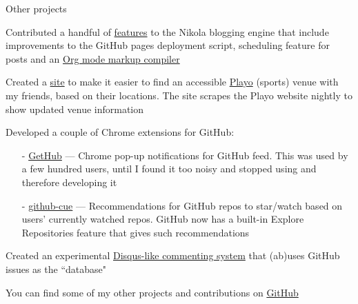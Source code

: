\begin{cventries}
{\begin{cvitems}
        \end{cvitems}
      }
  \cventry
      {Other projects}
      {}
      {} %
      {} %
      {
        \begin{cvitems} %
        \item {Contributed a handful of \href{https://github.com/getnikola/nikola/commits?author=punchagan}{features} to the Nikola blogging engine that include improvements to the GitHub pages deployment script, scheduling feature for posts and an \href{https://github.com/getnikola/plugins/tree/master/v8/orgmode}{Org mode markup compiler}}
        \item {Created a \href{https://punchagan.github.io/playo-find-venue/}{site} to make it easier to find an accessible \href{https://playo.co/}{Playo} (sports) venue with my friends, based on their locations. The site scrapes the Playo website nightly to show updated venue information}
        \item {Developed a couple of Chrome extensions for GitHub:
          \begin{itemize}[leftmargin=2ex, nosep, noitemsep]
          \item[-] {\href{https://github.com/punchagan/GetHub}{GetHub} --- Chrome pop-up notifications for GitHub feed. This was used by a few hundred users, until I found it too noisy and stopped using and therefore developing it}
          \item[-] {\href{https://github.com/punchagan/github-cue}{github-cue} --- Recommendations for GitHub repos to star/watch based on users' currently watched repos. GitHub now has a built-in Explore Repositories feature that gives such recommendations}
          \end{itemize}
        }
        \item {Created an experimental \href{https://github.com/punchagan/crumb}{Disqus-like commenting system} that (ab)uses GitHub issues as the ``database"}
        \item {You can find some of my other projects and contributions on \href{https://github.com/punchagan}{GitHub}}
        \end{cvitems}
      }
\end{cventries}
